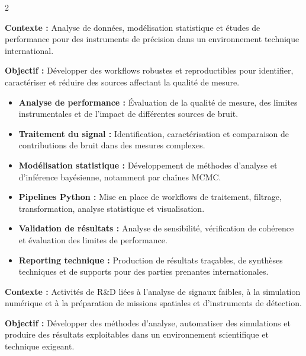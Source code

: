 \documentclass[8pt,a4paper,ragged2e,withhyper]{altacv}
\begin{document}
\begin{paracol}{2}
\divider


\textbf{Contexte :} Analyse de données, modélisation statistique et études de performance pour des instruments de précision dans un environnement technique international.

\textbf{Objectif :} Développer des workflows robustes et reproductibles pour identifier, caractériser et réduire des sources affectant la qualité de mesure.

\begin{itemize}
  \item \textbf{Analyse de performance :} Évaluation de la qualité de mesure, des limites instrumentales et de l’impact de différentes sources de bruit.
  \item \textbf{Traitement du signal :} Identification, caractérisation et comparaison de contributions de bruit dans des mesures complexes.
  \item \textbf{Modélisation statistique :} Développement de méthodes d’analyse et d’inférence bayésienne, notamment par chaînes MCMC.
  \item \textbf{Pipelines Python :} Mise en place de workflows de traitement, filtrage, transformation, analyse statistique et visualisation.
  \item \textbf{Validation de résultats :} Analyse de sensibilité, vérification de cohérence et évaluation des limites de performance.
  \item \textbf{Reporting technique :} Production de résultats traçables, de synthèses techniques et de supports pour des parties prenantes internationales.
\end{itemize}

\divider


\textbf{Contexte :} Activités de R\&D liées à l’analyse de signaux faibles, à la simulation numérique et à la préparation de missions spatiales et d’instruments de détection.

\textbf{Objectif :} Développer des méthodes d’analyse, automatiser des simulations et produire des résultats exploitables dans un environnement scientifique et technique exigeant.


\end{paracol}
\end{document}
